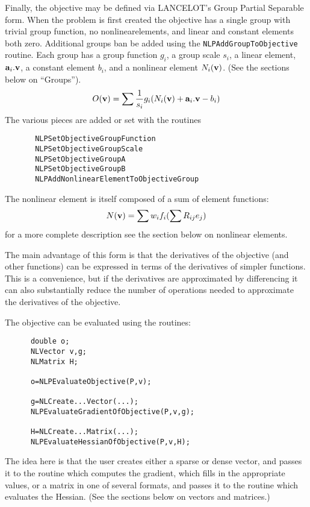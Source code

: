 \documentclass[12pt]{article}
\begin{document}
     Finally, the objective may be defined via LANCELOT's Group Partial Separable form. When the problem is 
     first created the objective has a single group with trivial group function, no nonlinearelements, and
     linear and constant elements both zero. Additional groups ban be added using the
     {\tt NLPAdd\-Group\-To\-Objective} routine. Each group has a group function $g_i$, a group scale $s_i$,
     a linear element, ${\bf a}_i.{\bf v}$, a constant element $b_i$, and a nonlinear element $N_i({\bf v})$.
     (See the sections below on ``Groups''). 
     \begin{displaymath}
       O({\bf v}) = \sum {1\over{s_i}}g_i(N_i({\bf v})+ {\bf a}_i.{\bf v}-b_i)
     \end{displaymath}
     The various pieces are added or set with the routines
     \begin{verbatim}
       NLPSetObjectiveGroupFunction
       NLPSetObjectiveGroupScale
       NLPSetObjectiveGroupA
       NLPSetObjectiveGroupB
       NLPAddNonlinearElementToObjectiveGroup
     \end{verbatim}
     The nonlinear element is itself composed of a sum of element functions:
     \begin{displaymath}
       N({\bf v}) = \sum w_i f_i( \sum R_{ij} e_j )
     \end{displaymath}
     for a more complete description see the section below on nonlinear elements.

     The main advantage of this form is that the derivatives of the objective (and other functions) can be
     expressed in terms of the derivatives of simpler functions. This is a convenience, but if the derivatives
     are approximated by differencing it can also substantially reduce the number of operations needed to approximate
     the derivatives of the objective.

     The objective can be evaluated using the routines:
     \begin{verbatim}
      double o;
      NLVector v,g;
      NLMatrix H;

      o=NLPEvaluateObjective(P,v);

      g=NLCreate...Vector(...);
      NLPEvaluateGradientOfObjective(P,v,g);

      H=NLCreate...Matrix(...);
      NLPEvaluateHessianOfObjective(P,v,H);
     \end{verbatim}
     The idea here is that the user creates either a sparse or dense vector, and passes it to the routine
     which computes the gradient, which fills in the appropriate values, or a matrix in one of several 
     formats, and passes it to the routine which evaluates the Hessian. (See the sections below on vectors
     and matrices.)
\end{document}
